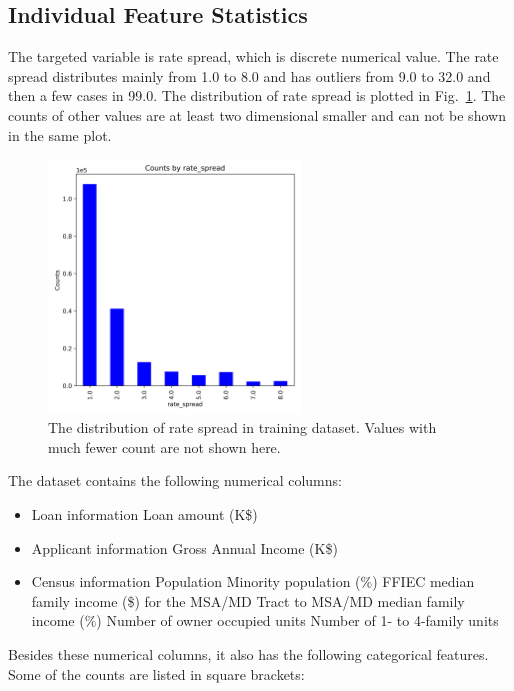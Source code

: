 \documentclass[a4paper,10pt,notitlepage]{article}
\begin{document}
\subsection{Individual Feature Statistics}

The targeted variable is rate spread, which is discrete numerical value. 
The rate spread distributes mainly from 1.0 to 8.0 and has outliers from 9.0 to 32.0 and then a few cases in 99.0. 
The distribution of rate spread is plotted in Fig.~\ref{fig:rate_spread}. The counts of other values are at least two dimensional smaller and can not be shown in the same plot.

\begin{figure}[htb]
\centering
\includegraphics[width=0.6\textwidth]{rate_spread_counts.png}
\caption{The distribution of rate spread in training dataset. Values with much fewer count are not shown here.}
\label{fig:rate_spread}
\end{figure}

The dataset contains the following numerical columns:

\begin{itemize}
\item Loan information
    \subitem Loan amount (K\$)
\item Applicant information
    \subitem Gross Annual Income (K\$)
\item Census information
    \subitem Population
    \subitem Minority population ($\%$)
    \subitem FFIEC median family income (\$) for the MSA/MD
    \subitem Tract to MSA/MD median family income ($\%$) 
    \subitem Number of owner occupied units
    \subitem Number of 1- to 4-family units
\end{itemize}

Besides these numerical columns, it also has the following categorical features. Some of the counts are listed in square brackets:
\end{document}

